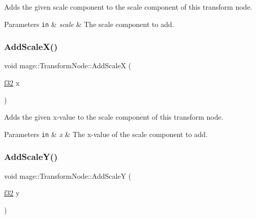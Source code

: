 Adds the given scale component to the scale component of this transform node.


\begin{DoxyParams}[1]{Parameters}
\mbox{\tt in}  & {\em scale} & The scale component to add. \\
\hline
\end{DoxyParams}
\hypertarget{structmage_1_1_transform_node_a517aa91abe1add130337c2e6ee8cbb6a}{}\label{structmage_1_1_transform_node_a517aa91abe1add130337c2e6ee8cbb6a} 
\subsubsection{\texorpdfstring{Add\+Scale\+X()}{AddScaleX()}}
{\footnotesize\ttfamily void mage\+::\+Transform\+Node\+::\+Add\+ScaleX (\begin{DoxyParamCaption}\item[{\hyperlink{namespacemage_a6a44ad388483959dc4dff9f2aef91431}{f32}}]{x }\end{DoxyParamCaption})\hspace{0.3cm}{\ttfamily [noexcept]}}

Adds the given x-\/value to the scale component of this transform node.


\begin{DoxyParams}[1]{Parameters}
\mbox{\tt in}  & {\em x} & The x-\/value of the scale component to add. \\
\hline
\end{DoxyParams}
\hypertarget{structmage_1_1_transform_node_acae345c8ecf3e21b800332afdfce9c73}{}\label{structmage_1_1_transform_node_acae345c8ecf3e21b800332afdfce9c73} 
\subsubsection{\texorpdfstring{Add\+Scale\+Y()}{AddScaleY()}}
{\footnotesize\ttfamily void mage\+::\+Transform\+Node\+::\+Add\+ScaleY (\begin{DoxyParamCaption}\item[{\hyperlink{namespacemage_a6a44ad388483959dc4dff9f2aef91431}{f32}}]{y }\end{DoxyParamCaption})\hspace{0.3cm}{\ttfamily [noexcept]}}


